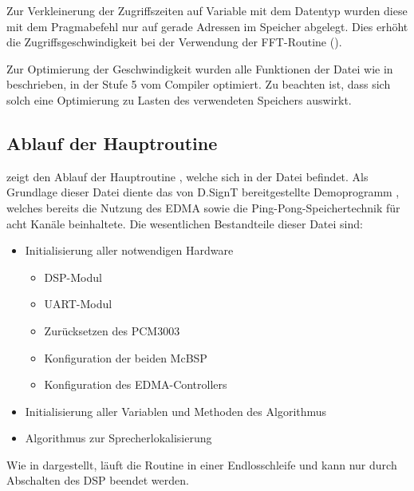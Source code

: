 Zur Verkleinerung der Zugriffszeiten auf Variable mit dem Datentyp  wurden diese mit dem Pragmabefehl  nur auf gerade Adressen im Speicher abgelegt. Dies erhöht die Zugriffsgeschwindigkeit bei der Verwendung der FFT-Routine (\vgl \cite[S. 67]{Master_Array_Pikora}).

Zur Optimierung der Geschwindigkeit wurden alle Funktionen der Datei  wie in \cite{Manual_TMS320C6000_opt} beschrieben, in der Stufe 5 vom Compiler optimiert. Zu beachten ist, dass sich solch eine Optimierung zu Lasten des verwendeten Speichers auswirkt.



\subsection{Ablauf der Hauptroutine}
\label{subsec:AblaufDerHauptroutineg}
 zeigt den Ablauf der Hauptroutine , welche sich in der Datei  befindet. Als Grundlage dieser Datei diente das von D.SignT bereitgestellte Demoprogramm , welches bereits die Nutzung des EDMA sowie die Ping-Pong-Speichertechnik für acht Kanäle beinhaltete. Die wesentlichen Bestandteile dieser Datei sind:


\begin{itemize}
    \item Initialisierung aller notwendigen Hardware
        \begin{itemize}
            \item DSP-Modul
            \item UART-Modul
            \item Zurücksetzen des PCM3003
            \item Konfiguration der beiden McBSP
            \item Konfiguration des EDMA-Controllers
        \end{itemize}
    \item Initialisierung aller Variablen und Methoden des Algorithmus
    \item Algorithmus zur Sprecherlokalisierung 
\end{itemize}

Wie in  dargestellt, läuft die Routine in einer Endlosschleife und kann nur durch Abschalten des DSP beendet werden.


